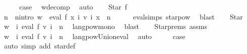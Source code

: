 \begin{isabellebody}
\ \ \isamarkupfalse%
\ \isamarkupfalse%
\ {\isacharquery}{\kern0pt}case\ \isamarkupfalse%
\ w{\isacharunderscore}{\kern0pt}decomp\ \isamarkupfalse%
\ auto\isanewline
{}\isamarkupfalse%
\isanewline
\ \ \isamarkupfalse%
\ {\isacharparenleft}{\kern0pt}Star\ f{\isacharparenright}{\kern0pt}\isanewline
\ \ \isamarkupfalse%
\ \isamarkupfalse%
\ n\ \ n{\isacharunderscore}{\kern0pt}intro{\isacharcolon}{\kern0pt}\ {\isachardoublequoteopen}w\ {\isasymin}\ {\isacharparenleft}{\kern0pt}eval\ f\ {\isacharparenleft}{\kern0pt}{\isasymlambda}x{\isachardot}{\kern0pt}\ {\isasymUnion}i{\isachardot}{\kern0pt}\ v\ i\ x{\isacharparenright}{\kern0pt}{\isacharparenright}{\kern0pt}\ {\isacharcircum}{\kern0pt}{\isacharcircum}{\kern0pt}\ n{\isachardoublequoteclose}\isanewline
\ \ \ \ \isamarkupfalse%
\ eval{\isachardot}{\kern0pt}simps{\isacharparenleft}{\kern0pt}{}{\isacharparenright}{\kern0pt}\ star{\isacharunderscore}{\kern0pt}pow\ \isamarkupfalse%
\ blast\isanewline
\ \ \isamarkupfalse%
\ Star\ \isamarkupfalse%
\ {\isachardoublequoteopen}w\ {\isasymin}\ {\isacharparenleft}{\kern0pt}{\isasymUnion}i{\isachardot}{\kern0pt}\ eval\ f\ {\isacharparenleft}{\kern0pt}v\ i{\isacharparenright}{\kern0pt}{\isacharparenright}{\kern0pt}\ {\isacharcircum}{\kern0pt}{\isacharcircum}{\kern0pt}\ n{\isachardoublequoteclose}\ \isamarkupfalse%
\ langpow{\isacharunderscore}{\kern0pt}mono\ \isamarkupfalse%
\ blast\isanewline
\ \ \isamarkupfalse%
\ Star{\isachardot}{\kern0pt}prems\ assms\ \isamarkupfalse%
\ {\isachardoublequoteopen}w\ {\isasymin}\ {\isacharparenleft}{\kern0pt}{\isasymUnion}i{\isachardot}{\kern0pt}\ eval\ f\ {\isacharparenleft}{\kern0pt}v\ i{\isacharparenright}{\kern0pt}\ {\isacharcircum}{\kern0pt}{\isacharcircum}{\kern0pt}\ n{\isacharparenright}{\kern0pt}{\isachardoublequoteclose}\ \isamarkupfalse%
\ langpow{\isacharunderscore}{\kern0pt}Union{\isacharunderscore}{\kern0pt}eval\ \isamarkupfalse%
\ auto\isanewline
\ \ \isamarkupfalse%
\ \isamarkupfalse%
\ {\isacharquery}{\kern0pt}case\ \isamarkupfalse%
\ {\isacharparenleft}{\kern0pt}auto\ simp\ add{\isacharcolon}{\kern0pt}\ star{\isacharunderscore}{\kern0pt}def{\isacharparenright}{\kern0pt}\isanewline

\end{isabellebody}
